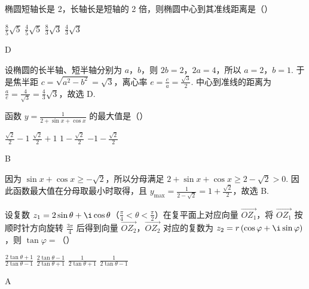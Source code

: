 \begin{problem}
椭圆短轴长是 2，长轴长是短轴的 2 倍，则椭圆中心到其准线距离是（\quad）

\choices
    {\(\frac{8}{5}\sqrt{5}\)}
    {\(\frac{4}{5}\sqrt{5}\)}
    {\(\frac{8}{3}\sqrt{3}\)}
    {\(\frac{4}{3}\sqrt{3}\)}
\end{problem}

\begin{answer}
D
\end{answer}

\begin{solution}
设椭圆的长半轴、短半轴分别为 \(a\)，\(b\)，则 \(2b=2\)，\(2a=4\)，所以 \(a=2\)，\(b=1\). 于是焦半距 \(c=\sqrt{a^{2}-b^{2}}=\sqrt{3}\)，离心率 \(e=\frac{c}{a}=\frac{\sqrt{3}}{2}\). 中心到准线的距离为 \(\frac{a}{e}=\frac{4}{\sqrt{3}}=\frac{4}{3}\sqrt{3}\)，故选 D.
\end{solution}

\begin{problem}
函数 \(y=\frac{1}{2+\sin x+\cos x}\) 的最大值是（\quad）

\choices
    {\(\frac{\sqrt{2}}{2}-1\)}
    {\(\frac{\sqrt{2}}{2}+1\)}
    {\(1-\frac{\sqrt{2}}{2}\)}
    {\(-1-\frac{\sqrt{2}}{2}\)}
\end{problem}

\begin{answer}
B
\end{answer}

\begin{solution}
因为 \(\sin x+\cos x\geq-\sqrt{2}\)，所以分母满足 \(2+\sin x+\cos x\geq2-\sqrt{2}>0\). 因此函数最大值在分母取最小时取得，且 \(y_{\max}=\frac{1}{2-\sqrt{2}}=1+\frac{\sqrt{2}}{2}\)，故选 B.
\end{solution}

\begin{problem}
设复数 \(z_{1}=2\sin\theta+\i\cos\theta\)（\(\frac{\pi}{4}<\theta<\frac{\pi}{2}\)）在复平面上对应向量 \(\overrightarrow{OZ_{1}}\)，将 \(\overrightarrow{OZ_{1}}\) 按顺时针方向旋转 \(\frac{3\pi}{4}\) 后得到向量 \(\overrightarrow{OZ_{2}}\)，\(\overrightarrow{OZ_{2}}\) 对应的复数为 \(z_{2}=r\left(\cos\varphi+\i\sin\varphi\right)\)，则 \(\tan\varphi=\)（\quad）

\choices
    {\(\frac{2\tan\theta+1}{2\tan\theta-1}\)}
    {\(\frac{2\tan\theta-1}{2\tan\theta+1}\)}
    {\(\frac{1}{2\tan\theta+1}\)}
    {\(\frac{1}{2\tan\theta-1}\)}
\end{problem}

\begin{answer}
A
\end{answer}


